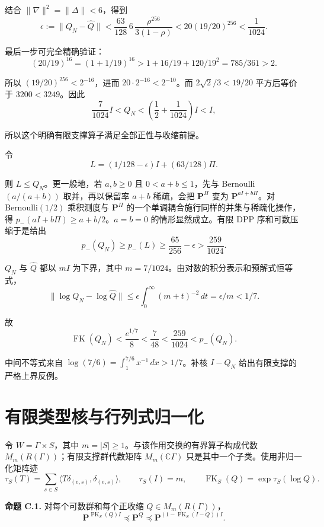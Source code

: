 \documentclass[UTF8,zihao=-4,a4paper]{ctexart}
\numberwithin{equation}{section}
\begin{document}
结合 \(\|\nabla\|^2=\|\Delta\|<6\)，得到
\[
\epsilon:=\|Q_N-\widehat Q\|
<\frac{63}{128}\,6\,\frac{\rho^{256}}{3(1-\rho)}
<20(19/20)^{256}<\frac1{1024}.
\tag{B.2}\label{eq:B.2}
\]

最后一步可完全精确验证：
\[
(20/19)^{16}=(1+1/19)^{16}
>1+16/19+120/19^2=785/361>2.
\]

所以 \((19/20)^{256}<2^{-16}\)，进而
\(20\cdot2^{-16}<2^{-10}\)。而
\(2\sqrt2/3<19/20\) 平方后等价于 \(3200<3249\)。因此
\[
\frac7{1024}I<Q_N<
\left(\frac12+\frac1{1024}\right)I<I,
\]

所以这个明确有限支撑算子满足全部正性与收缩前提。

令
\[
L=(1/128-\epsilon)I+(63/128)\Pi.
\]

则 \(L\le Q_N\)。更一般地，若 \(a,b\ge0\) 且 \(0<a+b\le1\)，先与
Bernoulli\((a/(a+b))\) 取并，再以保留率 \(a+b\) 稀疏，会把
\(\mathbf P^\Pi\) 变为 \(\mathbf P^{aI+b\Pi}\)。对 Bernoulli\((1/2)\) 乘积测度与 \(\mathbf P^\Pi\) 的一个单调耦合施行同样的并集与稀疏化操作，得
\(p_-(aI+b\Pi)\ge a+b/2\)。\(a=b=0\) 的情形显然成立。有限 DPP 序和可数压缩于是给出
\[
p_-(Q_N)\ge p_-(L)\ge\frac{65}{256}-\epsilon
>\frac{259}{1024}.
\tag{B.3}\label{eq:B.3}
\]


\(Q_N\) 与 \(\widehat Q\) 都以 \(mI\) 为下界，其中 \(m=7/1024\)。由对数的积分表示和预解式恒等式，
\[
\|\log Q_N-\log\widehat Q\|
\le\epsilon\int_0^\infty(m+t)^{-2}\,dt
=\epsilon/m<1/7.
\]

故
\[
\operatorname{FK}(Q_N)
<\frac{e^{1/7}}8
<\frac7{48}
<\frac{259}{1024}
<p_-(Q_N).
\tag{B.4}\label{eq:B.4}
\]

中间不等式来自
\(\log(7/6)=\int_1^{7/6}x^{-1}\,dx>1/7\)。补核 \(I-Q_N\) 给出有限支撑的严格上界反例。

\section{有限类型核与行列式归一化}

令 \(W=\Gamma\times S\)，其中 \(m=|S|\ge1\)。与该作用交换的有界算子构成代数
\(M_m(R(\Gamma))\)；有限支撑群代数矩阵
\(M_m(\mathbb C\Gamma)\) 只是其中一个子类。使用非归一化矩阵迹
\[
\tau_S(T)=\sum_{s\in S}
\langle T\delta_{(e,s)},\delta_{(e,s)}\rangle,
\qquad \tau_S(I)=m,
\qquad \operatorname{FK}_S(Q)=\exp\tau_S(\log Q).
\]


\textbf{命题 C.1.} 对每个可数群和每个正收缩
\(Q\in M_m(R(\Gamma))\)，
\[
\mathbf P^{\operatorname{FK}_S(Q)I}\preceq\mathbf P^Q
\preceq\mathbf P^{(1-\operatorname{FK}_S(I-Q))I}.
\tag{C.1}\label{eq:C.1}
\]
\end{document}
